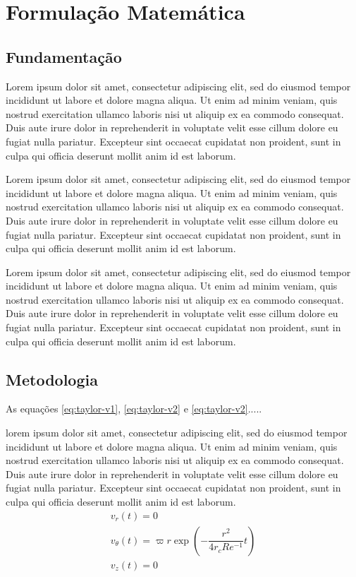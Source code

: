 \chapter{Formulação Matemática}

\section{Fundamentação}

Lorem ipsum dolor sit amet, consectetur adipiscing elit, sed do eiusmod tempor incididunt ut labore et dolore magna aliqua. Ut enim ad minim veniam, quis nostrud exercitation ullamco laboris nisi ut aliquip ex ea commodo consequat. Duis aute irure dolor in reprehenderit in voluptate velit esse cillum dolore eu fugiat nulla pariatur. Excepteur sint occaecat cupidatat non proident, sunt in culpa qui officia deserunt mollit anim id est laborum.

Lorem ipsum dolor sit amet, consectetur adipiscing elit, sed do eiusmod tempor incididunt ut labore et dolore magna aliqua. Ut enim ad minim veniam, quis nostrud exercitation ullamco laboris nisi ut aliquip ex ea commodo consequat. Duis aute irure dolor in reprehenderit in voluptate velit esse cillum dolore eu fugiat nulla pariatur. Excepteur sint occaecat cupidatat non proident, sunt in culpa qui officia deserunt mollit anim id est laborum.

Lorem ipsum dolor sit amet, consectetur adipiscing elit, sed do eiusmod tempor incididunt ut labore et dolore magna aliqua. Ut enim ad minim veniam, quis nostrud exercitation ullamco laboris nisi ut aliquip ex ea commodo consequat. Duis aute irure dolor in reprehenderit in voluptate velit esse cillum dolore eu fugiat nulla pariatur. Excepteur sint occaecat cupidatat non proident, sunt in culpa qui officia deserunt mollit anim id est laborum.

\section{Metodologia}

As equações \eqref{eq:taylor-v1}, \eqref{eq:taylor-v2} e \eqref{eq:taylor-v2}.....
 
lorem ipsum dolor sit amet, consectetur adipiscing elit, sed do eiusmod tempor incididunt ut labore et dolore magna aliqua. Ut enim ad minim veniam, quis nostrud exercitation ullamco laboris nisi ut aliquip ex ea commodo consequat. Duis aute irure dolor in reprehenderit in voluptate velit esse cillum dolore eu fugiat nulla pariatur. Excepteur sint occaecat cupidatat non proident, sunt in culpa qui officia deserunt mollit anim id est laborum.
%
\begin{subequations}
\begin{gather}
v_r(t) = 0 \label{eq:taylor-v1} \\
v_{\theta}(t) = \varpi r \exp \left( - \dfrac{r^2}{4r_cRe^{-1}}t \right)  \label{eq:taylor-v2} \\
v_z(t) = 0 \label{eq:taylor-v3}
\end{gather}
\end{subequations}

